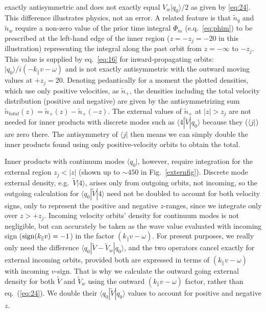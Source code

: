 \documentclass[12pt]{article}
\def\ket#1{|#1\rangle}
\def\bra#1{\langle#1}
\begin{document}
exactly antisymmetric and does not exactly equal $V_w\ket{q_0}/2$ as
given by \ref{eq:24}. This difference illustrates physics, not an
error. A related feature is that $\tilde n_q$ and $\tilde n_w$ require
a non-zero value of the prior time integral $\Phi_m$ (e.q.\
\ref{eq:phim}) to be prescribed at the left-hand edge of the inner
region ($z=-z_j=-20$ in this illustration) representing the integral
along the past orbit from $z=-\infty$ to $-z_j$. This value is supplied
by eq.\ \ref{eq:16} for inward-propagating orbits:
$\ket{q_0}/i(-k_\parallel v -\omega)$ and is not exactly antisymmetric
with the outward moving values at $+z_j=20$. Denoting pedantically for
a moment the plotted densities, which use only positive velocities, as
$\tilde n_+$, the densities including the total velocity distribution
(positive and negative) are given by the antisymmetrizing sum
$\tilde n_{total}(z)=\tilde n_+(z)-\tilde n_+(-z)$. The external
values of $\tilde n_+$ at $|z|>z_j$ are not needed for inner products
with discrete modes such as $\bra{4}|\tilde V\ket{q_0}$ because they
($\bra{j}|$) are zero there. The antisymmetry of $\bra{j}|$ then means
we can simply double the inner products found using only
positive-velocity orbits to obtain the total.

Inner products with continuum modes $\bra{q_0}|$, however, require
integration for the external region $z_j<|z|$ (shown up to $\sim 450$ in
Fig.\ \ref{externfig}). Discrete mode external density, e.g.\
$\tilde V \ket{4}$, arises only from outgoing orbits, not incoming, so
the outgoing calculation for $\bra{q_0}|\tilde V\ket{4}$ need not be
doubled to account for both velocity signs, only to represent the
positive and negative $z$-ranges, since we integrate only over
$z>+z_j$. Incoming velocity orbits' density for continuum modes is not
negligible, but can accurately be taken as the wave value evaluated
with incoming sign (${\rm sign}(k_\parallel v)=-1$) in the factor
$(k_\parallel v-\omega)$.  \iffalse Thus, incoming density in the
outer region is equal to outgoing times the factor
$R=\int_0^\infty (k_\parallel v-\omega)/(-k_\parallel v-\omega)\;
f_\infty(v)dv$, and the total external contribution to
$\bra{q_0}|\tilde V\ket{q_0}$ is $1+R$ times the outgoing.  \fi For
present purposes, we really only need the difference
$\bra{q_0}|\tilde V-\tilde V_w\ket{q_0}$, and the two operators cancel
exactly for external incoming orbits, provided both are expressed in
terms of $(k_\parallel v-\omega)$ with incoming $v$-sign.  That is why
we calculate the outward going external density for both $\tilde V$
and $\tilde V_w$ using the outward $(k_\parallel v-\omega)$ factor,
rather than eq.\ (\ref{eq:24}). We double their
$\bra{q_0}|\tilde V\ket{q_0}$ values to account for positive and
negative $z$.
\end{document}

